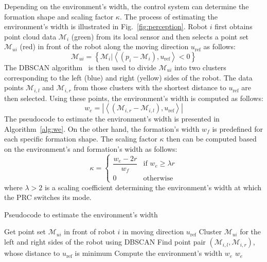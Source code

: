 Depending on the environment's width, the control system can determine the formation shape and scaling factor $\kappa$. The process of estimating the environment's width is illustrated in Fig.~\ref{fig:perception}. Robot $i$ first obtains point cloud data $\mathcal{M}_i$ (green) from its local sensor and then selects a point set $\mathcal{M}_{ui}$ (red) in front of the robot along the moving direction $u_\text{ref}$ as follows:
\begin{equation}
    \mathcal{M}_{ui} = \left\{\mathcal{M}_{i}\vert\left\langle\left(p_i-\mathcal{M}_{i}\right),u_\text{ref}\right\rangle<0\right\}
    \label{eqn:mui}
\end{equation}
The DBSCAN algorithm~\cite{10.5555/3001460.3001507} is then used to divide $\mathcal{M}_{ui}$ into two clusters corresponding to the left (blue) and right (yellow) sides of the robot. The data points $\mathcal{M}_{i,l}$ and $\mathcal{M}_{i,r}$ from those clusters with the shortest distance to $u_\text{ref}$ are then selected. Using these points, the environment's width is computed as follows:
\begin{equation}
    w_e= \left\vert\left\langle\left(\mathcal{M}_{i,r}-\mathcal{M}_{i,l}\right),u_\text{ref}\right\rangle\right\vert
    \label{eqn:we}
\end{equation}
The pseudocode to estimate the environment's width is presented in Algorithm~\ref{alg:we}. On the other hand, the formation's width $w_f$ is predefined for each specific formation shape. The scaling factor $\kappa$ then can be computed based on the environment's and formation's width as follows:
\begin{equation}
    \kappa = 
    \begin{cases} 
        \dfrac{w_e - 2r}{w_f} & \text{if } w_e \geq \lambda r \\
        0 & \text{otherwise}
    \end{cases}
    \label{eqn:kappa}
\end{equation}
where $\lambda > 2$ is a scaling coefficient determining the environment's width at which the PRC switches its mode. 

\begin{algorithm}[h!]
\caption{Pseudocode to estimate the environment's width}
\label{alg:we}
Get point set $\mathcal{M}_{ui}$ in front of robot $i$ in moving direction $u_\text{ref}$
Cluster $\mathcal{M}_{ui}$ for the left and right sides of the robot using DBSCAN\;
Find point pair $\left(\mathcal{M}_{i,l},\mathcal{M}_{i,r}\right)$, whose distance to $u_\text{ref}$ is minimum\;
Compute the environment's width $w_e$
\Return $w_e$\;
\end{algorithm}

